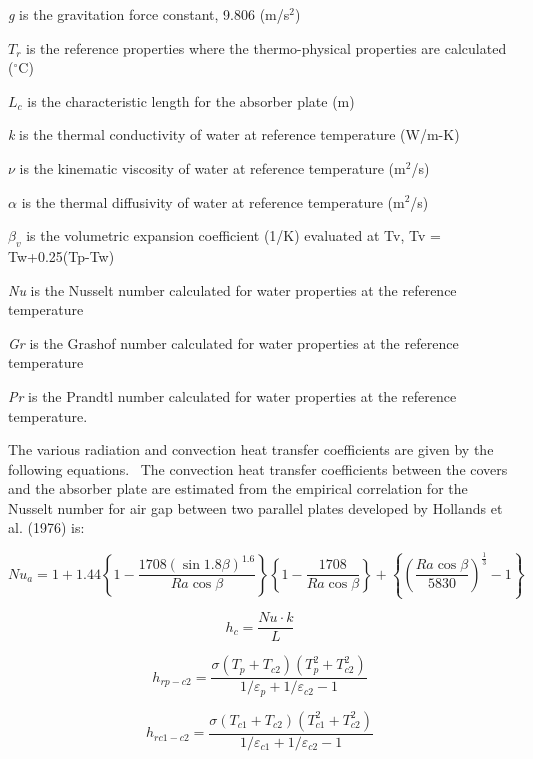 \emph{g} is the gravitation force constant, 9.806 (m/s\(^{2}\))

\(T_{r}\) is the reference properties where the thermo-physical properties are calculated (\(^{\circ}\)C)

\(L_{c}\) is the characteristic length for the absorber plate (m)

\emph{k} is the thermal conductivity of water at reference temperature (W/m-K)

\({\nu}\) is the kinematic viscosity of water at reference temperature (m\(^{2}\)/s)

\(\alpha\) is the thermal diffusivity of water at reference temperature (m\(^{2}\)/s)

\(\beta_{v}\) is the volumetric expansion coefficient (1/K) evaluated at Tv, Tv = Tw+0.25(Tp-Tw)

\emph{Nu} is the Nusselt number calculated for water properties at the reference temperature

\emph{Gr} is the Grashof number calculated for water properties at the reference temperature

\emph{Pr} is the Prandtl number calculated for water properties at the reference temperature.

The various radiation and convection heat transfer coefficients are given by the following equations.~ The convection heat transfer coefficients between the covers and the absorber plate are estimated from the empirical correlation for the Nusselt number for air gap between two parallel plates developed by Hollands et al. (1976) is:

\begin{equation}
N{u_a} = 1 + 1.44\left\{ {1 - \frac{{1708{{\left( {\sin 1.8\beta } \right)}^{1.6}}}}{{Ra\cos \beta }}} \right\}{\left\{ {1 - \frac{{1708}}{{Ra\cos \beta }}} \right\}} + {\left\{ {{{\left( {\frac{{Ra\cos \beta }}{{5830}}} \right)}^{{\frac{1}{3}}}} - 1} \right\}}
\end{equation}

\begin{equation}
{h_c} = {\frac{{Nu \cdot k}}{L}}
\end{equation}

\begin{equation}
{h_{rp - c2}} = \frac{{\sigma \left( {{T_p} + {T_{c2}}} \right)\left( {T_p^2 + T_{c2}^2} \right)}}{{1/{\varepsilon_p} + 1/{\varepsilon_{c2}} - 1}}
\end{equation}

\begin{equation}
{h_{rc1 - c2}} = \frac{{\sigma \left( {{T_{c1}} + {T_{c2}}} \right)\left( {T_{c1}^2 + T_{c2}^2} \right)}}{{1/{\varepsilon_{c1}} + 1/{\varepsilon_{c2}} - 1}}
\end{equation}

